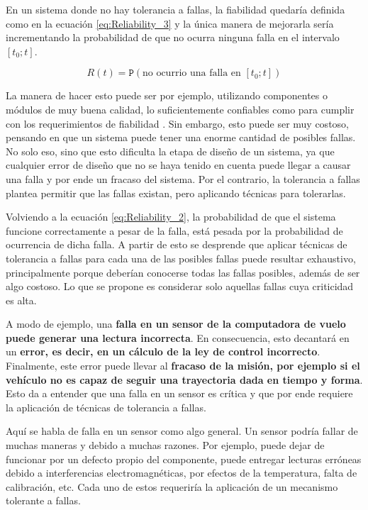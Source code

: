 En un sistema donde no hay tolerancia a fallas, la fiabilidad quedaría definida como en la ecuación \eqref{eq:Reliability_3} y la única manera de mejorarla sería incrementando la probabilidad de que no ocurra ninguna falla en el intervalo $[t_0;t]$.

\begin{equation}
    R(t) = \mathtt{P}\left( \text{no ocurrio una falla en $[t_0;t]$} \right)
    \label{eq:Reliability_3}
\end{equation}

La manera de hacer esto puede ser por ejemplo, utilizando componentes o módulos de muy buena calidad, lo suficientemente confiables como para cumplir con los requerimientos de fiabilidad \cite{nelson1990fault}. Sin embargo, esto puede ser muy costoso, pensando en que un sistema puede tener una enorme cantidad de posibles fallas. No solo eso, sino que esto dificulta la etapa de diseño de un sistema, ya que cualquier error de diseño que no se haya tenido en cuenta puede llegar a causar una falla y por ende un fracaso del sistema. Por el contrario, la tolerancia a fallas plantea permitir que las fallas existan, pero aplicando técnicas para tolerarlas.

Volviendo a la ecuación \eqref{eq:Reliability_2}, la probabilidad de que el sistema funcione correctamente a pesar de la falla, está pesada por la probabilidad de ocurrencia de dicha falla. A partir de esto se desprende que aplicar técnicas de tolerancia a fallas para cada una de las posibles fallas puede resultar exhaustivo, principalmente porque deberían conocerse todas las fallas posibles, además de ser algo costoso. Lo que se propone es considerar solo aquellas fallas cuya criticidad es alta.

A modo de ejemplo, una \textbf{falla en un sensor de la computadora de vuelo puede generar una lectura incorrecta}. En consecuencia, esto decantará en un \textbf{error, es decir, en un cálculo de la ley de control incorrecto}. Finalmente, este error puede llevar al \textbf{fracaso de la misión, por ejemplo si el vehículo no es capaz de seguir una trayectoria dada en tiempo y forma}. Esto da a entender que una falla en un sensor es crítica y que por ende requiere la aplicación de técnicas de tolerancia a fallas.

Aquí se habla de falla en un sensor como algo general. Un sensor podría fallar de muchas maneras y debido a muchas razones. Por ejemplo, puede dejar de funcionar por un defecto propio del componente, puede entregar lecturas erróneas debido a interferencias electromagnéticas, por efectos de la temperatura, falta de calibración, etc. Cada uno de estos requeriría la aplicación de un mecanismo tolerante a fallas.


